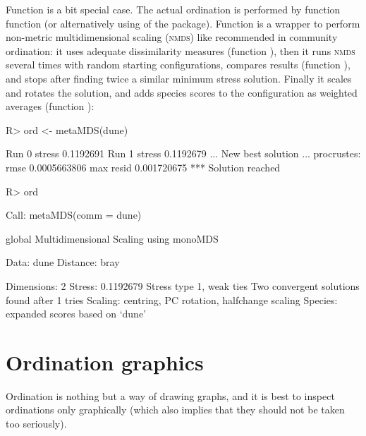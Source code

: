 \documentclass[article,nojss]{jss}
\begin{document}
Function  is a bit special case.  The actual ordination
is performed by function  function  (or
alternatively using  of the  package).
Function  is a wrapper to perform non-metric
multidimensional scaling (\textsc{nmds}) like recommended in community
ordination: it uses adequate dissimilarity measures (function
), then it runs \textsc{nmds} several times with random
starting configurations, compares results (function
), and stops after finding twice a similar minimum
stress solution.  Finally it scales and rotates the solution, and adds
species scores to the configuration as weighted averages (function
):
\begin{Schunk}
\begin{Sinput}
R> ord <- metaMDS(dune)
\end{Sinput}
\begin{Soutput}
Run 0 stress 0.1192691 
Run 1 stress 0.1192679 
... New best solution
... procrustes: rmse 0.0005663806  max resid 0.001720675 
*** Solution reached
\end{Soutput}
\begin{Sinput}
R> ord
\end{Sinput}
\begin{Soutput}
Call:
metaMDS(comm = dune) 

global Multidimensional Scaling using monoMDS

Data:     dune 
Distance: bray 

Dimensions: 2 
Stress:     0.1192679 
Stress type 1, weak ties
Two convergent solutions found after 1 tries
Scaling: centring, PC rotation, halfchange scaling 
Species: expanded scores based on ‘dune’ 
\end{Soutput}
\end{Schunk}

\section{Ordination graphics}

Ordination is nothing but a way of drawing graphs, and it is best to
inspect ordinations only graphically (which also implies that they
should not be taken too seriously).
\end{document}
